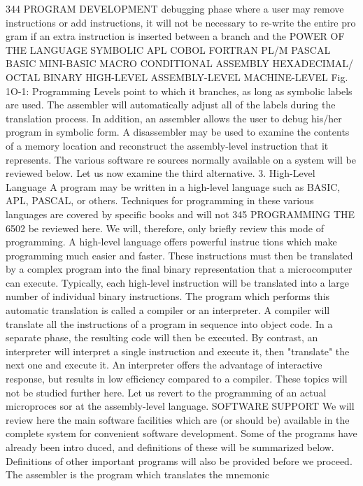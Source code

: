 \documentclass{book}
\begin{document}
{{{{{{{{{{{{{{{{{{{{{{{{{{{{{{{{{{{{{{{{{{{{{{{{{{{{{{{{{{{{{{{{{{{{{{{{{{{{{{{{{{{{{{{{{{{{{{{{{{{{{{{{{{{{{{{{{{{{{{{{{{{{{{{{{{{{{{{{{{{{344
PROGRAM DEVELOPMENT
debugging phase where a user may remove instructions or add
instructions, it will not be necessary to re-write the entire pro
gram if an extra instruction is inserted between a branch and the
POWER OF
THE
LANGUAGE
SYMBOLIC
APL
COBOL
FORTRAN
PL/M
PASCAL
BASIC
MINI-BASIC
MACRO
CONDITIONAL
ASSEMBLY
HEXADECIMAL/
OCTAL
BINARY
HIGH-LEVEL
ASSEMBLY-LEVEL
MACHINE-LEVEL
Fig. 1O-1: Programming Levels
point to which it branches, as long as symbolic labels are used.
The assembler will automatically adjust all of the labels during the
translation process. In addition, an assembler allows the user to debug
his/her program in symbolic form. A disassembler may be used to
examine the contents of a memory location and reconstruct the
assembly-level instruction that it represents. The various software re
sources normally available on a system will be reviewed below. Let us
now examine the third alternative.
3. High-Level Language
A program may be written in a high-level language such as
BASIC, APL, PASCAL, or others. Techniques for programming in
these various languages are covered by specific books and will not
345
PROGRAMMING THE 6502
be reviewed here. We will, therefore, only briefly review this mode
of programming. A high-level language offers powerful instruc
tions which make programming much easier and faster. These
instructions must then be translated by a complex program into
the final binary representation that a microcomputer can execute.
Typically, each high-level instruction will be translated into a
large number of individual binary instructions. The program
which performs this automatic translation is called a compiler or
an interpreter. A compiler will translate all the instructions of a
program in sequence into object code. In a separate phase, the
resulting code will then be executed. By contrast, an interpreter
will interpret a single instruction and execute it, then
"translate" the next one and execute it. An interpreter offers the
advantage of interactive response, but results in low efficiency
compared to a compiler. These topics will not be studied further
here. Let us revert to the programming of an actual microproces
sor at the assembly-level language.
SOFTWARE SUPPORT
We will review here the main software facilities which are (or
should be) available in the complete system for convenient
software development. Some of the programs have already been intro
duced, and definitions of these will be summarized below. Definitions
of other important programs will also be provided before we proceed.
The assembler is the program which translates the mnemonic
}}}}}}}}}}}}}}}}}}}}}}}}}}}}}}}}}}}}}}}}}}}}}}}}}}}}}}}}}}}}}}}}}}}}}}}}}}}}}}}}}}}}}}}}}}}}}}}}}}}}}}}}}}}}}}}}}}}}}}}}}}}}}}}}}}}}}}}}}}}}
\end{document}
